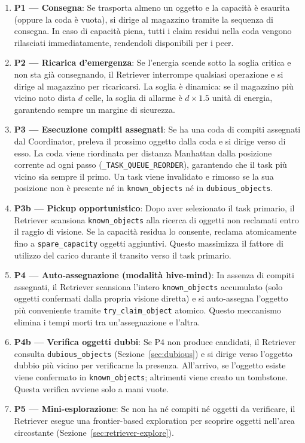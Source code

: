 \begin{enumerate}
    \item \textbf{P1 — Consegna}: Se trasporta almeno un oggetto e la capacit\`a \`e
          esaurita (oppure la coda \`e vuota), si dirige al magazzino tramite la sequenza
          di consegna. In caso di capacit\`a piena, tutti i claim residui nella coda
          vengono rilasciati immediatamente, rendendoli disponibili per i peer.
    \item \textbf{P2 — Ricarica d'emergenza}: Se l'energia scende sotto la soglia critica
          e non sta gi\`a consegnando, il Retriever interrompe qualsiasi operazione e si
          dirige al magazzino per ricaricarsi. La soglia \`e dinamica: se il magazzino
          pi\`u vicino noto dista $d$ celle, la soglia di allarme \`e $d \times 1.5$
          unit\`a di energia, garantendo sempre un margine di sicurezza.
    \item \textbf{P3 — Esecuzione compiti assegnati}: Se ha una coda di compiti assegnati
          dal Coordinator, preleva il prossimo oggetto dalla coda e si dirige verso di esso.
          La coda viene riordinata per distanza Manhattan dalla posizione corrente ad ogni
          passo (\texttt{\_TASK\_QUEUE\_REORDER}), garantendo che il task pi\`u vicino sia
          sempre il primo. Un task viene invalidato e rimosso se la sua posizione non \`e
          presente n\'e in \texttt{known\_objects} n\'e in \texttt{dubious\_objects}.
    \item \textbf{P3b — Pickup opportunistico}: Dopo aver selezionato il task primario, il
          Retriever scansiona \texttt{known\_objects} alla ricerca di oggetti non reclamati
          entro il raggio di visione. Se la capacit\`a residua lo consente, reclama
          atomicamente fino a \texttt{spare\_capacity} oggetti aggiuntivi. Questo massimizza
          il fattore di utilizzo del carico durante il transito verso il task primario.
    \item \textbf{P4 — Auto-assegnazione (modalit\`a hive-mind)}: In assenza di compiti
          assegnati, il Retriever scansiona l'intero \texttt{known\_objects} accumulato
          (solo oggetti confermati dalla propria visione diretta) e si auto-assegna
          l'oggetto pi\`u conveniente tramite \texttt{try\_claim\_object} atomico. Questo
          meccanismo elimina i tempi morti tra un'assegnazione e l'altra.
    \item \textbf{P4b — Verifica oggetti dubbi}: Se P4 non produce candidati, il Retriever
          consulta \texttt{dubious\_objects} (Sezione~\ref{sec:dubious}) e si dirige verso
          l'oggetto dubbio pi\`u vicino per verificarne la presenza. All'arrivo, se
          l'oggetto esiste viene confermato in \texttt{known\_objects}; altrimenti viene
          creato un tombstone. Questa verifica avviene solo a mani vuote.
    \item \textbf{P5 — Mini-esplorazione}: Se non ha n\'e compiti n\'e oggetti da
          verificare, il Retriever esegue una frontier-based exploration per scoprire
          oggetti nell'area circostante (Sezione~\ref{sec:retriever-explore}).
\end{enumerate}

